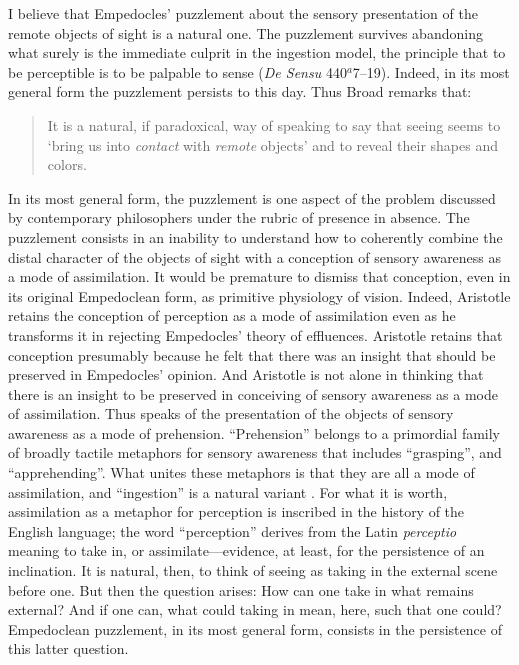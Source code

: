 \documentclass[12pt]{article}
\begin{document}
I believe that Empedocles' puzzlement about the sensory presentation of the remote objects of sight is a natural one. The puzzlement survives abandoning what surely is the immediate culprit in the ingestion model, the principle that to be perceptible is to be palpable to sense (\emph{De Sensu} 440\( ^{a} \)7--19). Indeed, in its most general form the puzzlement persists to this day. Thus Broad remarks that:
\begin{quote}
    It is a natural, if paradoxical, way of speaking to say that seeing seems to `bring us into \emph{contact} with \emph{remote} objects' and to reveal their shapes and colors. \citep[33]{Broad:1952kx}
\end{quote}
In its most general form, the puzzlement is one aspect of the problem discussed by contemporary philosophers under the rubric of presence in absence. The puzzlement consists in an inability to understand how to coherently combine the distal character of the objects of sight with a conception of sensory awareness as a mode of assimilation. It would be premature to dismiss that conception, even in its original Empedoclean form, as primitive physiology of vision. Indeed, Aristotle retains the conception of perception as a mode of assimilation even as he transforms it in rejecting Empedocles' theory of effluences. Aristotle retains that conception presumably because he felt that there was an insight that should be preserved in Empedocles' opinion. And Aristotle is not alone in thinking that there is an insight to be preserved in conceiving of sensory awareness as a mode of assimilation. Thus \citet{Broad:1952kx} speaks of the presentation of the objects of sensory awareness as a mode of prehension.  ``Prehension'' belongs to a primordial family of broadly tactile metaphors for sensory awareness that includes ``grasping'', and ``apprehending''. What unites these metaphors is that they are all a mode of assimilation, and ``ingestion'' is a natural variant \citep[see][7]{Johnston:2006uq,Price:1932fk}. For what it is worth, assimilation as a metaphor for perception is inscribed in the history of the English language; the word ``perception'' derives from the Latin \emph{perceptio} meaning to take in, or assimilate---evidence, at least, for the persistence of an inclination. It is natural, then, to think of seeing as taking in the external scene before one. But then the question arises: How can one take in what remains external? And if one can, what could taking in mean, here, such that one could? Empedoclean puzzlement, in its most general form, consists in the persistence of this latter question.
\end{document}
